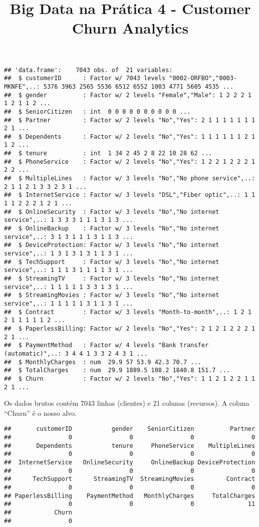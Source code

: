 \documentclass[]{article}
\title{Big Data na Prática 4 - Customer Churn Analytics}
\author{}
\date{\vspace{-2.5em}}
\begin{document}
\maketitle

\begin{verbatim}
## 'data.frame':    7043 obs. of  21 variables:
##  $ customerID      : Factor w/ 7043 levels "0002-ORFBO","0003-MKNFE",..: 5376 3963 2565 5536 6512 6552 1003 4771 5605 4535 ...
##  $ gender          : Factor w/ 2 levels "Female","Male": 1 2 2 2 1 1 2 1 1 2 ...
##  $ SeniorCitizen   : int  0 0 0 0 0 0 0 0 0 0 ...
##  $ Partner         : Factor w/ 2 levels "No","Yes": 2 1 1 1 1 1 1 1 2 1 ...
##  $ Dependents      : Factor w/ 2 levels "No","Yes": 1 1 1 1 1 1 2 1 1 2 ...
##  $ tenure          : int  1 34 2 45 2 8 22 10 28 62 ...
##  $ PhoneService    : Factor w/ 2 levels "No","Yes": 1 2 2 1 2 2 2 1 2 2 ...
##  $ MultipleLines   : Factor w/ 3 levels "No","No phone service",..: 2 1 1 2 1 3 3 2 3 1 ...
##  $ InternetService : Factor w/ 3 levels "DSL","Fiber optic",..: 1 1 1 1 2 2 2 1 2 1 ...
##  $ OnlineSecurity  : Factor w/ 3 levels "No","No internet service",..: 1 3 3 3 1 1 1 3 1 3 ...
##  $ OnlineBackup    : Factor w/ 3 levels "No","No internet service",..: 3 1 3 1 1 1 3 1 1 3 ...
##  $ DeviceProtection: Factor w/ 3 levels "No","No internet service",..: 1 3 1 3 1 3 1 1 3 1 ...
##  $ TechSupport     : Factor w/ 3 levels "No","No internet service",..: 1 1 1 3 1 1 1 1 3 1 ...
##  $ StreamingTV     : Factor w/ 3 levels "No","No internet service",..: 1 1 1 1 1 3 3 1 3 1 ...
##  $ StreamingMovies : Factor w/ 3 levels "No","No internet service",..: 1 1 1 1 1 3 1 1 3 1 ...
##  $ Contract        : Factor w/ 3 levels "Month-to-month",..: 1 2 1 2 1 1 1 1 1 2 ...
##  $ PaperlessBilling: Factor w/ 2 levels "No","Yes": 2 1 2 1 2 2 2 1 2 1 ...
##  $ PaymentMethod   : Factor w/ 4 levels "Bank transfer (automatic)",..: 3 4 4 1 3 3 2 4 3 1 ...
##  $ MonthlyCharges  : num  29.9 57 53.9 42.3 70.7 ...
##  $ TotalCharges    : num  29.9 1889.5 108.2 1840.8 151.7 ...
##  $ Churn           : Factor w/ 2 levels "No","Yes": 1 1 2 1 2 2 1 1 2 1 ...
\end{verbatim}

Os dados brutos contém 7043 linhas (clientes) e 21 colunas (recursos). A
coluna ``Churn'' é o nosso alvo.

\begin{verbatim}
##       customerID           gender    SeniorCitizen          Partner 
##                0                0                0                0 
##       Dependents           tenure     PhoneService    MultipleLines 
##                0                0                0                0 
##  InternetService   OnlineSecurity     OnlineBackup DeviceProtection 
##                0                0                0                0 
##      TechSupport      StreamingTV  StreamingMovies         Contract 
##                0                0                0                0 
## PaperlessBilling    PaymentMethod   MonthlyCharges     TotalCharges 
##                0                0                0               11 
##            Churn 
##                0
\end{verbatim}
\end{document}

